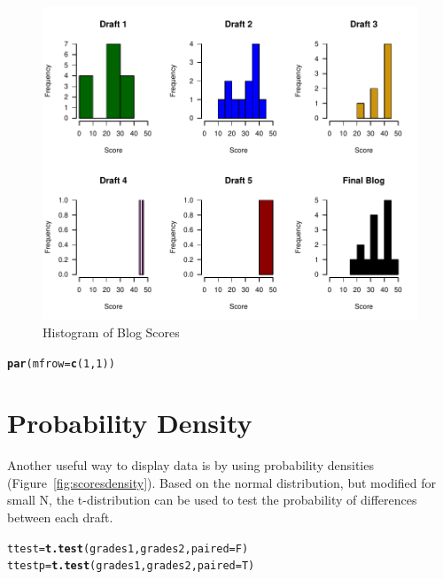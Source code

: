\documentclass{article}\usepackage[]{graphicx}\usepackage[]{color}
\makeatletter
\def\maxwidth{ %
  \ifdim\Gin@nat@width>\linewidth
    \linewidth
  \else
    \Gin@nat@width
  \fi
}
\newcommand{\hlnum}[1]{\textcolor[rgb]{0.686,0.059,0.569}{#1}}%
\newcommand{\hlstd}[1]{\textcolor[rgb]{0.345,0.345,0.345}{#1}}%
\newcommand{\hlkwb}[1]{\textcolor[rgb]{0.69,0.353,0.396}{#1}}%
\newcommand{\hlkwc}[1]{\textcolor[rgb]{0.333,0.667,0.333}{#1}}%
\newcommand{\hlkwd}[1]{\textcolor[rgb]{0.737,0.353,0.396}{\textbf{#1}}}%
\newenvironment{kframe}{%
 \def\at@end@of@kframe{}%
 \ifinner\ifhmode%
  \def\at@end@of@kframe{\end{minipage}}%
  \begin{minipage}{\columnwidth}%
 \fi\fi%
 \def\FrameCommand##1{\hskip\@totalleftmargin \hskip-\fboxsep
 \colorbox{shadecolor}{##1}\hskip-\fboxsep
     \hskip-\linewidth \hskip-\@totalleftmargin \hskip\columnwidth}%
 \MakeFramed {\advance\hsize-\width
   \@totalleftmargin\z@ \linewidth\hsize
   \@setminipage}}%
 {\par\unskip\endMakeFramed%
 \at@end@of@kframe}
\newenvironment{knitrout}{}{} %
\makeatother
\begin{document}
\begin{knitrout}
\begin{figure}
\includegraphics[width=\maxwidth]{figure/scoreshist-1} \caption[Histogram of Blog Scores]{Histogram of Blog Scores}\label{fig:scoreshist}
\end{figure}

\begin{kframe}\begin{alltt}
\hlkwd{par}\hlstd{(}\hlkwc{mfrow}\hlstd{=}\hlkwd{c}\hlstd{(}\hlnum{1}\hlstd{,}\hlnum{1}\hlstd{))}
\end{alltt}
\end{kframe}
\end{knitrout}


\section{Probability Density}

Another useful way to display data is by using probability densities (Figure~\ref{fig:scoresdensity}). Based on the normal distribution, but modified for small N, the t-distribution can be used to test the probability of differences between each draft.

\begin{knitrout}
\color{fgcolor}\begin{kframe}
\begin{alltt}
\hlstd{ttest} \hlkwb{=} \hlkwd{t.test}\hlstd{(grades1, grades2,} \hlkwc{paired}\hlstd{=F)}
\hlstd{ttestp} \hlkwb{=} \hlkwd{t.test}\hlstd{(grades1, grades2,} \hlkwc{paired}\hlstd{=T)}
\end{alltt}
\end{kframe}
\end{knitrout}
\end{document}
